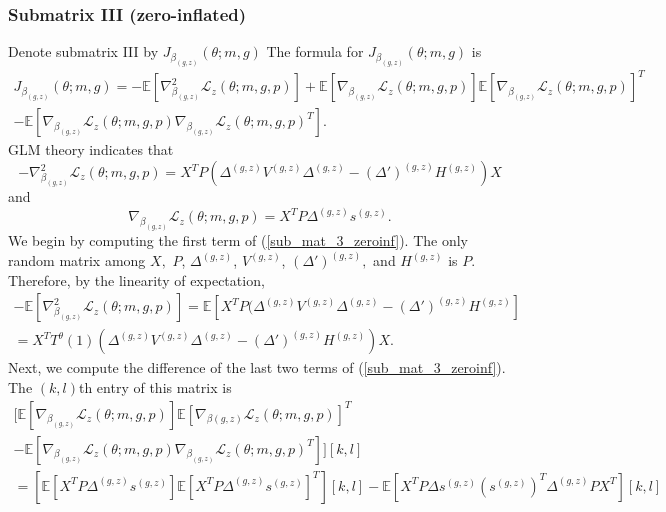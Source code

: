 \documentclass[12pt]{article}
\begin{document}
\begin{appendices}
\begin{refsection}
		\subsubsection*{Submatrix III (zero-inflated)}
		Denote submatrix III by $J_{\beta_{(g,z)}}(\theta; m, g)$ The formula for $J_{\beta_{(g,z)}}(\theta; m, g)$ is
		\begin{multline}\label{sub_mat_3_zeroinf}
		J_{\beta_{(g,z)}}(\theta; m, g) = -\mathbb{E} \left[\nabla_{\beta_{(g,z)}}^2 \mathcal{L}_z(\theta; m, g, p) \right] + \mathbb{E}\left[ \nabla_{\beta_{(g,z)}} \mathcal{L}_z(\theta; m, g, p) \right] \mathbb{E}\left[\nabla_{\beta_{(g,z)}} \mathcal{L}_z(\theta; m, g, p) \right]^T \\ - \mathbb{E}\left[ \nabla_{\beta_{(g,z)}} \mathcal{L}_z(\theta; m, g, p) \nabla_{\beta_{(g,z)}} \mathcal{L}_z(\theta; m, g, p)^T \right].
		\end{multline}
		GLM theory indicates that
		$$ -\nabla_{\beta_{(g,z)}}^2 \mathcal{L}_z(\theta; m, g, p) =  X^T P ( \Delta^{(g,z)}V^{(g,z)}\Delta^{(g,z)} - (\Delta')^{(g,z)} H^{(g,z)}) X$$ and
		$$ \nabla_{\beta_{(g,z)}} \mathcal{L}_z(\theta; m, g, p) = X^T P \Delta^{(g,z)} s^{(g,z)}.$$
		We begin by computing the first term of (\ref{sub_mat_3_zeroinf}). The only random matrix among $X,$ $P$, $\Delta^{(g,z)}$, $V^{(g,z)}$, $(\Delta')^{(g,z)},$ and $H^{(g,z)}$ is $P$. Therefore, by the linearity of expectation,
		\begin{multline}\label{sub_mat_3_zeroinf_1}
		-\mathbb{E} \left[\nabla_{\beta_{(g,z)}}^2 \mathcal{L}_z(\theta; m, g, p) \right]   = \mathbb{E} \left[ X^T P (\Delta^{(g,z)}V^{(g,z)}\Delta^{(g,z)} - (\Delta')^{(g,z)} H^{(g,z)} \right] \\ = X^T T^{\theta}(1) ( \Delta^{(g,z)}V^{(g,z)}\Delta^{(g,z)} - (\Delta')^{(g,z)} H^{(g,z)}) X.
		\end{multline}
		Next, we compute the difference of the last two terms of (\ref{sub_mat_3_zeroinf}). The $(k,l)$th entry of this matrix is
		\begin{multline*}
		\bigg[ \mathbb{E} \left[\nabla_{\beta_{(g,z)}} \mathcal{L}_z(\theta; m, g, p) \right] \mathbb{E} \left[\nabla_{\beta{(g,z)}} \mathcal{L}_z(\theta; m, g, p)\right]^T \\ - \mathbb{E} \left[ \nabla_{{\beta_{(g,z)}}} \mathcal{L}_z(\theta; m, g, p) \nabla_{{\beta_{(g,z)}}} \mathcal{L}_z(\theta; m, g, p)^T \right] \bigg] [k,l] \\ 
		= \left[ \mathbb{E} \left[ {X}^T P \Delta^{(g,z)} s^{(g,z)} \right]\mathbb{E} \left[ {X}^T P \Delta^{(g,z)} s^{(g,z)} \right]^T\right][k,l] - \mathbb{E} \left[ {X}^T P \Delta s^{(g,z)} (s^{(g,z)})^T \Delta^{(g,z)} P {X}^T \right][k,l] \\ 

\end{multline*}
\end{refsection}
\end{appendices}
\end{document}
